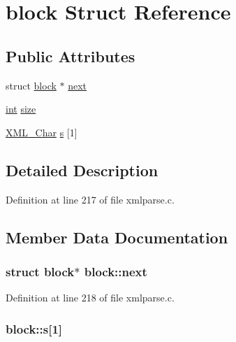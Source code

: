 \hypertarget{structblock}{}\section{block Struct Reference}
\label{structblock}
\subsection*{Public Attributes}
\begin{DoxyCompactItemize}
\item 
struct \hyperlink{structblock}{block} $\ast$ \hyperlink{structblock_a2673a4d5a335adea413ee6d8aa394781}{next}
\item 
\hyperlink{xmltok_8h_a5a0d4a5641ce434f1d23533f2b2e6653}{int} \hyperlink{structblock_a0ffa8f1f3773c38a4b91cdf179448af2}{size}
\item 
\hyperlink{amiga_2include_2libraries_2expat_8h_a63da96463e775e1ec3a7d1f076208127}{X\+M\+L\+\_\+\+Char} \hyperlink{structblock_a3958012beaa6b751e996a5aae68cdacf}{s} \mbox{[}1\mbox{]}
\end{DoxyCompactItemize}


\subsection{Detailed Description}


Definition at line 217 of file xmlparse.\+c.



\subsection{Member Data Documentation}
\subsubsection[{\texorpdfstring{next}{next}}]{\setlength{\rightskip}{0pt plus 5cm}struct {\bf block}$\ast$ block\+::next}\hypertarget{structblock_a2673a4d5a335adea413ee6d8aa394781}{}\label{structblock_a2673a4d5a335adea413ee6d8aa394781}


Definition at line 218 of file xmlparse.\+c.

\subsubsection[{\texorpdfstring{s}{s}}]{ block\+::s\mbox{[}1\mbox{]}}\hypertarget{structblock_a3958012beaa6b751e996a5aae68cdacf}{}\label{structblock_a3958012beaa6b751e996a5aae68cdacf}


